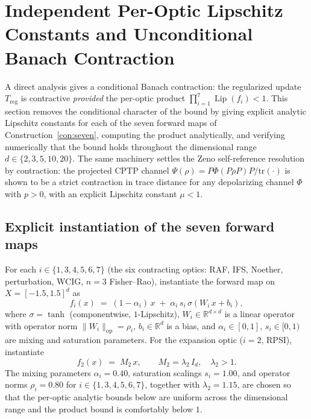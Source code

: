 \documentclass[11pt,a4paper]{article}
\theoremstyle{plain}
\theoremstyle{definition}
\theoremstyle{remark}
\newcommand{\RR}{\mathbb{R}}
\DeclareMathOperator{\Lip}{Lip}
\begin{document}

\section{Independent Per-Optic Lipschitz Constants and Unconditional Banach Contraction}\label{sec:lipschitz}

A direct analysis gives a conditional Banach contraction:
the regularized update $T_{\mathrm{reg}}$ is contractive \emph{provided}
the per-optic product $\prod_{i=1}^{7}\Lip(f_{i})<1$. This section
removes the conditional character of the bound by giving explicit
analytic Lipschitz constants for each of the seven forward maps of
Construction~\ref{con:seven}, computing the product analytically, and
verifying numerically that the bound holds throughout the dimensional
range $d\in\{2,3,5,10,20\}$. The same machinery settles
the Zeno self-reference resolution by
contraction: the projected CPTP channel
$\Psi(\rho)=P\Phi(P\rho P)P/\mathrm{tr}(\cdot)$ is shown to be a strict
contraction in trace distance for any depolarizing channel $\Phi$ with
$p>0$, with an explicit Lipschitz constant $\mu<1$.

\subsection{Explicit instantiation of the seven forward maps}

For each $i\in\{1,3,4,5,6,7\}$ (the six contracting optics: RAF, IFS,
Noether, perturbation, WCIG, $n=3$ Fisher--Rao), instantiate the
forward map on $X=[-1.5,1.5]^{d}$ as
\begin{equation}\label{eq:fi-contracting}
  f_{i}(x) \;=\; (1-\alpha_{i})\,x \;+\; \alpha_{i}\,s_{i}\,\sigma(W_{i}\,x+b_{i}),
\end{equation}
where $\sigma=\tanh$ (componentwise, $1$-Lipschitz), $W_{i}\in\RR^{d\times
d}$ is a linear operator with operator norm $\|W_{i}\|_{\mathrm{op}}=\rho_{i}$,
$b_{i}\in\RR^{d}$ is a bias, and $\alpha_{i}\in[0,1]$, $s_{i}\in[0,1)$
are mixing and saturation parameters. For the expansion optic
($i=2$, RPSI), instantiate
\begin{equation}\label{eq:f2-expansion}
  f_{2}(x) \;=\; M_{2}\,x,\qquad M_{2}=\lambda_{2}\,I_{d},\quad \lambda_{2}>1.
\end{equation}
The mixing parameters $\alpha_{i}=0.40$, saturation scalings
$s_{i}=1.00$, and operator norms $\rho_{i}=0.80$ for $i\in
\{1,3,4,5,6,7\}$, together with $\lambda_{2}=1.15$, are chosen so
that the per-optic analytic bounds below are uniform across the
dimensional range and the product bound is comfortably below $1$.
\end{document}
